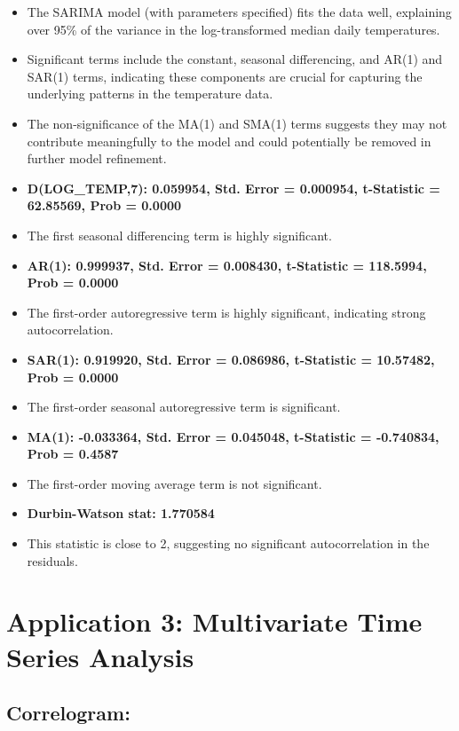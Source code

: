 \documentclass{article} %
\begin{document}
\begin{itemize}
    \item The SARIMA model (with parameters specified) fits the data well, explaining over 95\% of the variance in the log-transformed median daily temperatures.
    \item Significant terms include the constant, seasonal differencing, and AR(1) and SAR(1) terms, indicating these components are crucial for capturing the underlying patterns in the temperature data.
    \item The non-significance of the MA(1) and SMA(1) terms suggests they may not contribute meaningfully to the model and could potentially be removed in further model refinement.
    \item \textbf{D(LOG\_TEMP,7): 0.059954, Std. Error = 0.000954, t-Statistic = 62.85569, Prob = 0.0000}
    \item The first seasonal differencing term is highly significant.
    \item \textbf{AR(1): 0.999937, Std. Error = 0.008430, t-Statistic = 118.5994, Prob = 0.0000}
    \item The first-order autoregressive term is highly significant, indicating strong autocorrelation.
    \item \textbf{SAR(1): 0.919920, Std. Error = 0.086986, t-Statistic = 10.57482, Prob = 0.0000}
    \item The first-order seasonal autoregressive term is significant.
    \item \textbf{MA(1): -0.033364, Std. Error = 0.045048, t-Statistic = -0.740834, Prob = 0.4587}
    \item The first-order moving average term is not significant.
    \item \textbf{Durbin-Watson stat: 1.770584}
    \item This statistic is close to 2, suggesting no significant autocorrelation in the residuals.
\end{itemize}

\section{Application 3: Multivariate Time Series Analysis}
\subsection{Correlogram:}
\end{document}
